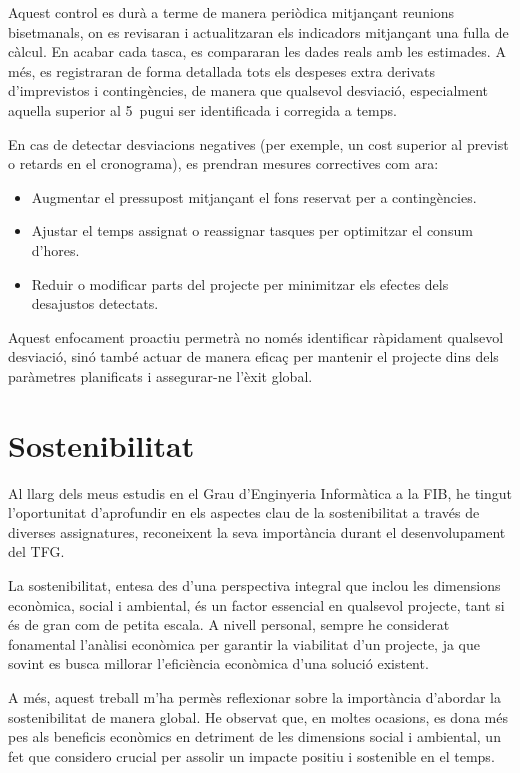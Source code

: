 \documentclass[a4paper,12pt]{report}
\begin{document}
Aquest control es durà a terme de manera periòdica mitjançant reunions bisetmanals, on es revisaran i actualitzaran els indicadors mitjançant una fulla de càlcul. En acabar cada tasca, es compararan les dades reals amb les estimades. A més, es registraran de forma detallada tots els despeses extra derivats d’imprevistos i contingències, de manera que qualsevol desviació, especialment aquella superior al 5\, pugui ser identificada i corregida a temps.

En cas de detectar desviacions negatives (per exemple, un cost superior al previst o retards en el cronograma), es prendran mesures correctives com ara:

\begin{itemize}
    \item Augmentar el pressupost mitjançant el fons reservat per a contingències.
    \item Ajustar el temps assignat o reassignar tasques per optimitzar el consum d’hores.
    \item Reduir o modificar parts del projecte per minimitzar els efectes dels desajustos detectats.
\end{itemize}

Aquest enfocament proactiu permetrà no només identificar ràpidament qualsevol desviació, sinó també actuar de manera eficaç per mantenir el projecte dins dels paràmetres planificats i assegurar-ne l’èxit global.

\section{Sostenibilitat}

Al llarg dels meus estudis en el Grau d'Enginyeria Informàtica a la FIB, he tingut l'oportunitat d'aprofundir en els aspectes clau de la sostenibilitat a través de diverses assignatures, reconeixent la seva importància durant el desenvolupament del TFG.

La sostenibilitat, entesa des d'una perspectiva integral que inclou les dimensions econòmica, social i ambiental, és un factor essencial en qualsevol projecte, tant si és de gran com de petita escala. A nivell personal, sempre he considerat fonamental l'anàlisi econòmica per garantir la viabilitat d'un projecte, ja que sovint es busca millorar l'eficiència econòmica d'una solució existent.

A més, aquest treball m'ha permès reflexionar sobre la importància d'abordar la sostenibilitat de manera global. He observat que, en moltes ocasions, es dona més pes als beneficis econòmics en detriment de les dimensions social i ambiental, un fet que considero crucial per assolir un impacte positiu i sostenible en el temps.
\end{document}
